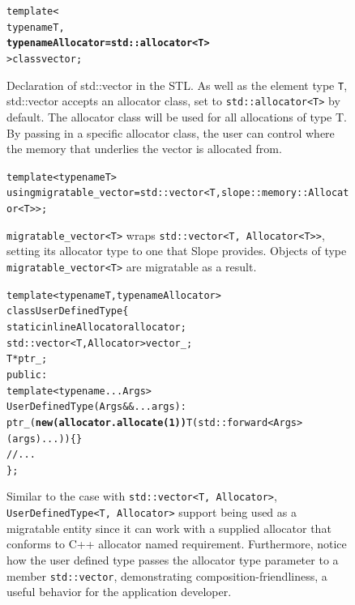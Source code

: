 
\begin{figure}[t]
\begin{alltt}
template<
    typename T,
    \textbf{typename Allocator = std::allocator<T>}
> class vector;
\end{alltt}
\label{fig:stdvector}
\caption{
    Declaration of std::vector in the STL. As well as the element type \texttt{T},
    std::vector accepts an allocator class, set to \texttt{std{::}allocator<T>} by
    default. The allocator class will be used for all allocations of type T.
    By passing in a specific allocator class, the user can control where the
    memory that underlies the vector is allocated from.
}
\end{figure}



\begin{figure}[t]
\begin{alltt}
template<typename T>
using migratable_vector = std::vector<T, slope::memory::Allocator<T>>;

\end{alltt}
\caption{
\texttt{migratable\_vector<T>} wraps \texttt{std{::}vector<T, Allocator<T>>}, setting
its allocator type to one that Slope provides. Objects of type
\texttt{migratable\_vector<T>} are migratable as a result.
}
\label{fig:migvector}
\end{figure}





\begin{figure}[t]
\begin{alltt}
template<typename T, typename Allocator>
class UserDefinedType \{
  static inline Allocator allocator;
  std::vector<T, Allocator> vector_;
  T *ptr_;
 public:
  template<typename... Args>
  UserDefinedType(Args&&... args):
    ptr_(\textbf{new (allocator.allocate(1))} T(std::forward<Args>(args)...)) \{ \}
  // ...
\};
\end{alltt}
\caption{
Similar to the case with \texttt{std{::}vector<T, Allocator>},
\texttt{UserDefinedType<T, Allocator>} support being used as a migratable
    entity since it can work
with a supplied allocator that conforms to C++ allocator named requirement.
Furthermore, notice how the user defined type passes the allocator type parameter
to a member \texttt{std{::}vector}, demonstrating composition-friendliness, a
useful behavior for the application developer.
}
\end{figure}


